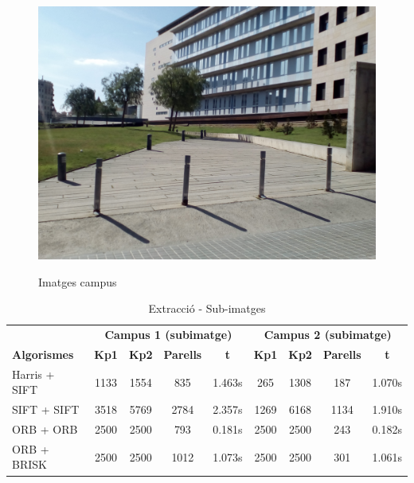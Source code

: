 \begin{figure}[!htb]
				\label{fig:awesome_image3}
			\endminipage\hfill
				\includegraphics[width=\linewidth]{images/experiments/uni4}
				\label{fig:awesome_image3}
			\endminipage
			\caption{Imatges campus}
		\end{figure}

		\begin{table}[H]
			\begin{center}
				\begin{tabular}{l | c c c c | c c c c}
					& \multicolumn{4}{c|}{\textbf{Campus 1 (subimatge)}} & \multicolumn{4}{c}{\textbf{Campus 2 (subimatge)}} \\
					\textbf{Algorismes} & \textbf{Kp1} & \textbf{Kp2} & \textbf{Parells} & \textbf{t} & \textbf{Kp1} & \textbf{Kp2} & \textbf{Parells} & \textbf{t} \\ \hline
					Harris + SIFT & 1133 & 1554 & 835 & 1.463s & 265 & 1308 & 187 & 1.070s \\
					SIFT + SIFT & 3518 & 5769 & 2784 & 2.357s & 1269 & 6168 & 1134 & 1.910s \\
					ORB + ORB & 2500 & 2500 & 793 & 0.181s & 2500 & 2500 & 243 & 0.182s \\
					ORB + BRISK & 2500 & 2500 & 1012 & 1.073s & 2500 & 2500 & 301 & 1.061s \\
				\end{tabular}
			\end{center}
			\caption{Extracció - Sub-imatges}
		\end{table}

